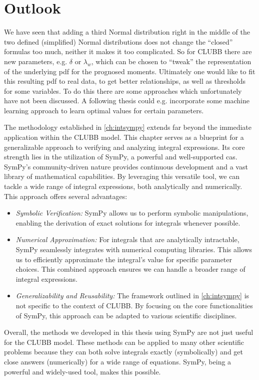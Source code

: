\chapter{Outlook}\label{ch:outlook}

We have seen that adding a third Normal distribution right in the middle of the two defined (simplified) Normal distributions does not change the \enquote{closed} formulas too much, neither it makes it too complicated.
So for \gls{CLUBB} there are new parameters, e.g. $\delta$ or $\lambda_w$, which can be chosen to \enquote{tweak} the representation of the underlying \gls{pdf} for the prognosed moments.
Ultimately one would like to fit this resulting \gls{pdf} to real data, to get better relationships, as well as thresholds for some variables.
To do this there are some approaches which unfortunately have not been discussed.
A following thesis could e.g. incorporate some machine learning approach to learn optimal values for certain parameters.

The methodology established in \autoref{ch:intsympy} extends far beyond the immediate application within the \gls{CLUBB} model.
This chapter serves as a blueprint for a generalizable approach to verifying and analyzing integral expressions.
Its core strength lies in the utilization of SymPy, a powerful and well-supported \gls{cas}.
SymPy's community-driven nature provides continuous development and a vast library of mathematical capabilities.
By leveraging this versatile tool, we can tackle a wide range of integral expressions, both analytically and numerically.
This approach offers several advantages:
\begin{itemize}
    \item \emph{Symbolic Verification:}
    SymPy allows us to perform symbolic manipulations, enabling the derivation of exact solutions for integrals whenever possible.
    \item \emph{Numerical Approximation:}
    For integrals that are analytically intractable, SymPy seamlessly integrates with numerical computing libraries.
    This allows us to efficiently approximate the integral's value for specific parameter choices.
    This combined approach ensures we can handle a broader range of integral expressions.
    \item \emph{Generalizability and Reusability:} The framework outlined in \cref{ch:intsympy} is not specific to the context of \gls{CLUBB}.
    By focusing on the core functionalities of SymPy, this approach can be adapted to various scientific disciplines.
\end{itemize}
Overall, the methods we developed in this thesis using SymPy are not just useful for the \gls{CLUBB} model.
These methods can be applied to many other scientific problems because they can both solve integrals exactly (symbolically) and get close answers (numerically) for a wide range of equations.
SymPy, being a powerful and widely-used tool, makes this possible.